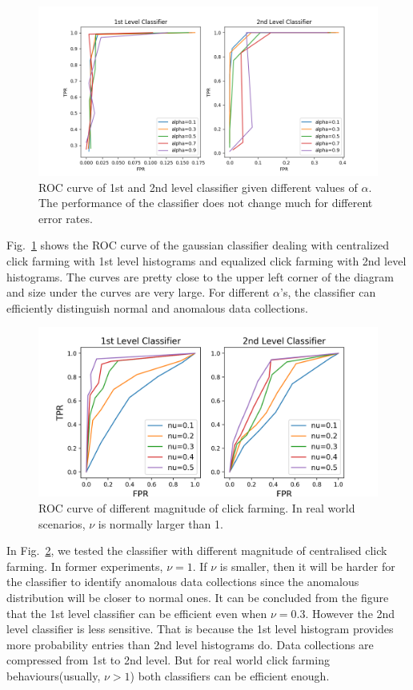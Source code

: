 \documentclass[10pt,conference,letterpaper]{IEEEtran}
\begin{document}
			\begin{figure}[!t]
				\centering
				\includegraphics[width=\linewidth]{fig/ROC-Alpha.png}
				\caption{ROC curve of 1st and 2nd level classifier given different values of $\alpha$. The performance of the classifier does not change much for different error rates.}
				\label{fig:roc-alpha}
			\end{figure}
	
			Fig.~\ref{fig:roc-alpha} shows the ROC curve of the gaussian classifier dealing with centralized click farming with 1st level histograms and equalized click farming with 2nd level histograms. The curves are pretty close to the upper left corner of the diagram and size under the curves are very large. For different $\alpha$'s, the classifier can efficiently distinguish normal and anomalous data collections.
			
			\begin{figure}[!t]
				\centering
				\includegraphics[width=\linewidth]{fig/ROC-Nu.png}
				\caption{ROC curve of different magnitude of click farming. In real world scenarios, $\nu$ is normally larger than 1.}
				\label{fig:roc-magnitude}
			\end{figure}
	
			In Fig.~\ref{fig:roc-magnitude}, we tested the classifier with different magnitude of centralised click farming. In former experiments, $\nu = 1$. If $\nu $ is smaller, then it will be harder for the classifier to identify anomalous data collections since the anomalous distribution will be closer to normal ones. It can be concluded from the figure that the 1st level classifier can be efficient even when $\nu = 0.3$. However the 2nd level classifier is less sensitive. That is because the 1st level histogram provides more probability entries than 2nd level histograms do. Data collections are compressed from 1st to 2nd level. But for real world click farming behaviours(usually, $\nu > 1$) both classifiers can be efficient enough.
	
\end{document}
